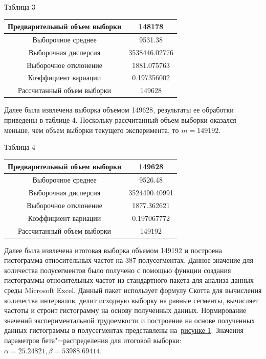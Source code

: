 \documentclass[a4paper,fontsize=14pt]{article}
\begin{document}
\begin{center}
	\label{table3}
	Таблица 3 \\
	\hfill \break
	\begin{tabular}{|c|c|}
		\hline
		Предварительный объем выборки & 148178 \\
		\hline
		Выборочное среднее & 9531.38 \\
		\hline
		Выборочная дисперсия & 3538446.02776 \\
		\hline
		Выборочное отклонение & 1881.075763 \\
		\hline
		Коэффициент вариации & 0.197356002 \\
		\hline
		Рассчитанный объем выборки & 149628 \\
		\hline
	\end{tabular}
\end{center}

Далее была извлечена выборка объемом 149628, результаты ее обработки приведены в таблице 4. Поскольку рассчитанный объем выборки оказался меньше, чем объем выборки текущего эксперимента, то $m = 149192$.

\begin{center}
	\label{table4}
	Таблица 4 \\
	\hfill \break
	\begin{tabular}{|c|c|}
		\hline
		Предварительный объем выборки & 149628 \\
		\hline
		Выборочное среднее & 9526.48 \\
		\hline
		Выборочная дисперсия & 3524490.40991 \\
		\hline
		Выборочное отклонение & 1877.362621 \\
		\hline
		Коэффициент вариации & 0.197067772 \\
		\hline
		Рассчитанный объем выборки & 149192 \\
		\hline
	\end{tabular}
\end{center}

Далее была извлечена итоговая выборка объемом 149192 и построена гистограмма относительных частот на 387 полусегментах. Данное значение для количества полусегментов было получено с помощью функции создания гистограммы относительных частот из стандартного пакета для анализа данных среды Microsoft Excel. Данный пакет использует формулу Скотта для вычисления количества интервалов, делит исходную выборку на равные сегменты, вычисляет частоты и строит гистограмму на основу полученных данных. Нормирование значений экспериментальной трудоемкости и построение на основе полученных данных гистограммы в полусегментах представлены на~\hyperref[image1]{рисунке 1}. Значения параметров бета"=распределения для итоговой выборки: $\alpha = 25.24821, \beta = 53988.69414$.
\end{document}
